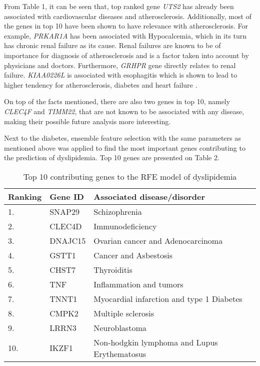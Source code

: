 \documentclass{ba-kecs}
\numberwithin{figure}{section}
\numberwithin{equation}{section}
\begin{document}
From Table 1, it can be seen that, top ranked gene \textit{UTS2} has already been associated with cardiovascular diseases and atherosclerosis. Additionally, most of the genes in top 10 have been shown to have relevance with atherosclerosis. For example,
\textit{PRKAR1A} has been associated with Hypocalcemia, which in its turn has chronic renal failure as its cause. Renal failures are known to be of importance for diagnosis of atherosclerosis and is a factor taken into account by physicians and doctors. Furthermore, \textit{GRHPR} gene directly relates to renal failure. \textit{KIAA0226L} is associated with esophagitis which is shown to lead to higher tendency for atherosclerosis, diabetes and heart failure \cite{esophagitis}.

On top of the facts mentioned, there are also two genes in top 10, namely \textit{CLEC4F} and \textit{TIMM22}, that are not known to be associated with any disease, making their possible future analysis more interesting.

Next to the diabetes, ensemble feature selection with the same parameters as mentioned above was applied to find the most important genes contributing to the prediction of dyslipidemia. Top 10 genes are presented on Table 2.
\begin{table}
\centering
\begin{tabular}{|l|l|p{4cm}|}
\hline
Ranking & Gene ID & Associated disease/disorder \\ \hline
1. & SNAP29 & Schizophrenia\\ \hline
2. & CLEC4D & Immunodeficiency\\ \hline
3. & DNAJC15 & Ovarian cancer and Adenocarcinoma\\ \hline
4. & GSTT1 & Cancer and Asbestosis\\ \hline
5. & CHST7 & Thyroiditis\\ \hline
6. & TNF & Inflammation and tumors\\ \hline
7. & TNNT1 & Myocardial infarction and type 1 Diabetes\\ \hline
8. & CMPK2 & Multiple sclerosis\\ \hline
9. & LRRN3 & Neuroblastoma\\ \hline
10. & IKZF1 & Non-hodgkin lymphoma and Lupus Erythematosus\\ \hline
\end{tabular}

\caption{Top 10 contributing genes to the RFE model of dyslipidemia}
\label{Top 10 contributing genes to the RFE model of dyslipidemia}
\end{table}
\end{document}
